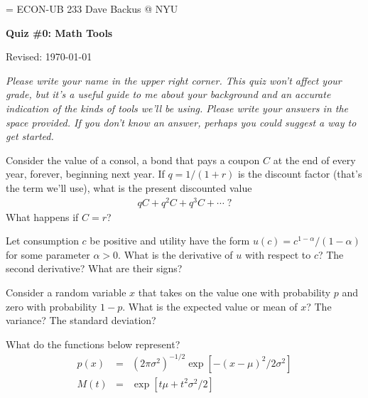 \documentclass[11pt]{exam}
\begin{document}
\parskip=\bigskipamount
\parindent=0.0in
\thispagestyle{empty}
{\large ECON-UB 233 \hfill Dave Backus @ NYU}

\bigskip\bigskip
\centerline{\Large \bf Quiz \#0:  Math Tools}
\centerline{Revised: \today}

{\it Please write your name in the upper right corner.
This quiz won't affect your grade, but 
it's a useful guide to me about your background and 
an accurate indication of the kinds of tools we'll be using.
Please write your answers in the space provided.
If you don't know an answer, perhaps you could suggest a way to get started.}

\begin{questions}
\question Consider the value of a consol,
a bond that pays a coupon $C$ at the end of every year, forever,
beginning next year.
If $q = 1/(1+r)$ is the discount factor (that's the term we'll use),
what is the present discounted value
\begin{eqnarray*}
    q C + q^2 C + q^3 C + \cdots \; ?
\end{eqnarray*}
What happens if $C=r$?

\vspace{2.5in}
\question Let consumption $c$ be positive and utility have the form
$u(c) = c^{1-\alpha}/(1-\alpha)$ for some parameter $\alpha > 0$.
What is the derivative of $u$ with respect to $c$?
The second derivative?
What are their signs?

\pagebreak
\question Consider a random variable $x$ that takes on the value one with probability $p$
and zero with probability $1-p$.
What is the expected value or mean of $x$?
The variance?  The standard deviation?


\vspace{3.5in}
\question What do the functions below represent?
\begin{eqnarray*}
    p(x) &=& (2 \pi \sigma^2)^{-1/2} \exp[ - (x-\mu)^2/2 \sigma^2] \\
    M(t) &=& \exp[ t \mu + t^2 \sigma^2/2] 
\end{eqnarray*}

\begin{comment}
\vspace{2in}
\question Suppose you have two matrices,
\begin{eqnarray*}
A \;\;=\;\; \left[
            \begin{array}{cc}
            1 & 2 \\ 2 & 1
            \end{array}
            \right] \;\;\mbox{ and }\;\;
B \;\;=\;\; \left[
            \begin{array}{ccc}
            1 & 2 & 3 \\ 4 & 5 & 6
            \end{array}
            \right] .
\end{eqnarray*}
What is AB?  BA?
\end{comment}
\end{questions}
\end{document}

